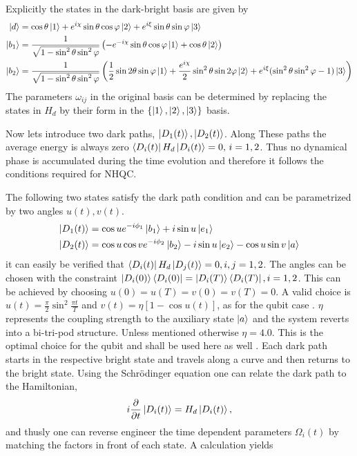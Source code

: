 Explicitly the states in the dark-bright basis are given by 
\begin{equation}
\label{eq:states}
\begin{aligned}
\ket{d} &= \cos\theta\ket{1} + e^{i\chi}\sin\theta\cos\varphi\ket{2} + e^{i\xi}\sin\theta\sin\varphi\ket{3}
\\
\ket{b_1} &= \frac{1}{\sqrt{1-\sin^2\theta\sin^2\varphi}} \left(-e^{-i\chi}\sin\theta\cos\varphi\ket{1} + \cos\theta\ket{2} \right)
\\
\ket{b_2} &= \frac{1}{\sqrt{1-\sin^2\theta\sin^2\varphi}} \left(\frac{1}{2}\sin 2\theta\sin\varphi\ket{1} + \dfrac{e^{i\chi}}{2}\sin^2\theta\sin 2\varphi\ket{2} + e^{i\xi}(\sin^2\theta\sin^2\varphi - 1)\ket{3}\right)
\end{aligned}
\end{equation}
The parameters $\omega_{ij}$ in the original basis can be determined by replacing the states in $H_d$ by their form in the $\{\ket{1},\ket{2},\ket{3}\}$ basis.

Now lets introduce two dark paths, $\ket{D_1(t)},\ket{D_2(t)}$. Along These paths the average energy is always zero $\bra{D_i(t)}H_d\ket{D_i(t)} = 0,\,i = 1,2$. Thus no dynamical phase is accumulated during the time evolution and therefore it follows the conditions required for NHQC.

The following two states satisfy the dark path condition and can be parametrized by two angles $u(t), v(t)$.
\begin{equation}
\label{eq:dpaths}
\begin{aligned}
\ket{D_1(t)} &= \cos u e^{-i\phi_1}\ket{b_1} + i\sin u \ket{e_1}
\\
\ket{D_2(t)} &= \cos u\cos v e^{-i\phi_2}\ket{b_2} - i\sin u \ket{e_2} - \cos u\sin v \ket{a}
\end{aligned}
\end{equation}
it can easily be verified that $\bra{D_i(t)}H_d\ket{D_j(t)} = 0, i,j = 1,2$. The angles can be chosen with the constraint $\ket{D_i(0)}\bra{D_i(0)} = \ket{D_i(T)}\bra{D_i(T)}, i = 1,2$. This can be achieved by choosing $u(0) = u(T) = v(0) = v(T) = 0$. A valid choice is $u(t) = \frac{\pi}{2}\sin^2\frac{\pi t}{T}$ and $v(t) = \eta\left[1 - \cos u(t)\right]$, as for the qubit case \cite{darkpath}. $\eta$ represents the coupling strength to the auxiliary state $\ket{a}$ and the system reverts into a bi-tri-pod structure. Unless mentioned otherwise $\eta = 4.0$. This is the optimal choice for the qubit and shall be used here as well \cite{darkpath}. Each dark path starts in the respective bright state and travels along a curve and then returns to the bright state. Using the Schrödinger equation one can relate the dark path to the Hamiltonian,
\begin{equation}
i\pdv{}{t}\ket{D_i(t)} = H_d\ket{D_i(t)},
\end{equation}
and thusly one can reverse engineer the time dependent parameters $\Omega_i(t)$ by matching the factors in front of each state. A calculation yields 

